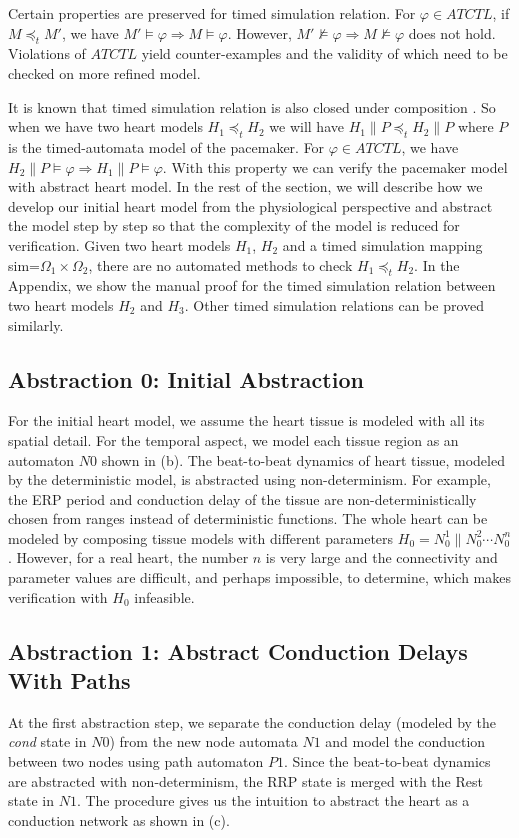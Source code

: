 Certain properties are preserved for timed simulation relation. For $\varphi\in ATCTL$, if $M\preceq_t M'$, we have $M'\models \varphi\Rightarrow M\models\varphi$.\cite{simulation} However, $M'\not\models \varphi\Rightarrow M\not\models\varphi$ does not hold. Violations of $ATCTL$ yield \textsf{counter-examples} and the validity of which need to be checked on more refined model.

It is known that timed simulation relation is also closed under composition \cite{simulation}. So when we have two heart models $H_1\preceq_t H_2$ we will have $H_1\| P\preceq_t H_2\| P$ where $P$ is the timed-automata model of the pacemaker. For $\varphi\in ATCTL$, we have $H_2\| P\models\varphi\Rightarrow H_1\| P\models\varphi$. With this property we can verify the pacemaker model with abstract heart model. In the rest of the section, we will describe how we develop our initial heart model from the physiological perspective and abstract the model step by step so that the complexity of the model is reduced for verification. Given two heart models $H_1$, $H_2$ and a timed simulation mapping \textsf{sim}=$\Omega_1\times\Omega_2$, there are no automated methods to check $H_1\preceq_t H_2$. In the Appendix, we show the manual proof for the timed simulation relation between two heart models $H_2$ and $H_3$. Other timed simulation relations can be proved similarly.
\subsection{Abstraction 0: Initial Abstraction}
For the initial heart model, we assume the heart tissue is modeled with all its spatial detail. For the temporal aspect, we model each tissue region as an automaton $N0$ shown in (b). The beat-to-beat dynamics of heart tissue, modeled by the deterministic model, is abstracted using non-determinism. For example, the ERP period and conduction delay of the tissue are non-deterministically chosen from ranges instead of deterministic functions. The whole heart can be modeled by composing tissue models with different parameters $H_0=N_0^1\|N_0^2\cdots N_0^n$. However, for a real heart, the number $n$ is very large and the connectivity and parameter values are difficult, and perhaps impossible, to determine, which makes verification with $H_0$ infeasible. 

\subsection{Abstraction 1: Abstract Conduction Delays With Paths}
At the first abstraction step, we separate the conduction delay (modeled by the \emph{cond} state in $N0$) from the new node automata $N1$ and model the conduction between two nodes using path automaton $P1$. Since the beat-to-beat dynamics are abstracted with non-determinism, the RRP state is merged with the Rest state in $N1$. The procedure gives us the intuition to abstract the heart as a conduction network as shown in  (c). 

